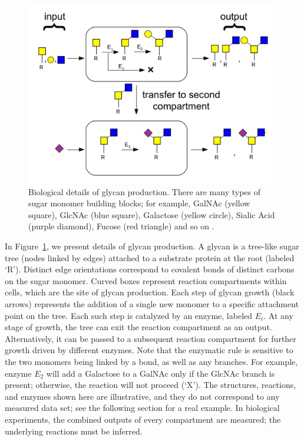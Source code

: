 \begin{figure}[t]
  \centering
  \begin{minipage}{0.54\linewidth}
    \includegraphics[width=0.9\linewidth]{gfig1.png}    
  \end{minipage}
  \begin{minipage}{0.44\linewidth}
    \caption{Biological details of glycan production. There are many types of sugar monomer building blocks; %
      for example, GalNAc (yellow square), GlcNAc (blue square), Galactose (yellow circle), Sialic Acid (purple diamond), Fucose (red triangle) and so on \cite{Varki2017}.}
    \label{fig:glycan-rule}
  \end{minipage}
\vspace{-9mm}
\end{figure}

In Figure~\ref{fig:glycan-rule}, we present details of glycan production. A glycan is a tree-like sugar tree (nodes linked by edges) attached to a substrate protein at the root (labeled `R'). Distinct edge orientations correspond to covalent bonds of distinct carbons on the sugar monomer. Curved boxes represent reaction compartments within cells, which are the site of glycan production. Each step of glycan growth (black arrows) represents the addition of a single new monomer to a specific attachment point on the tree. Each such step is catalyzed by an enzyme, labeled $E_i$. At any stage of growth, the tree can exit the reaction compartment as an output. Alternatively, it can be passed to a subsequent reaction compartment for further growth driven by different enzymes. Note that the enzymatic rule is sensitive to the two monomers being linked by a bond, as well as any branches. For example, enzyme $E_2$ will add a Galactose to a GalNAc only if the GlcNAc branch is present; otherwise, the reaction will not proceed (`X'). The structures, reactions, and enzymes shown here are illustrative, and they do not correspond to any measured data set; see the following section for a real example. In biological experiments, the combined outputs of every compartment are measured; the underlying reactions must be inferred.


